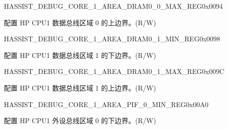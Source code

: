 \begin{register}{H}{ASSIST\_DEBUG\_CORE\_1\_AREA\_DRAM0\_0\_MAX\_REG}{0x0094}\label{regdesc:ASSISTDEBUGCORE1AREADRAM00MAXREG}
%
\regnewline%
\begin{regdesc}\begin{reglist}
\label{fielddesc:ASSISTDEBUGCORE1AREADRAM00MAX}\item [ASSIST\_DEBUG\_CORE\_1\_AREA\_DRAM0\_0\_MAX] 配置 HP CPU1 数据总线区域 0 的上边界。(R/W)
\end{reglist}\end{regdesc}
\end{register}


\begin{register}{H}{ASSIST\_DEBUG\_CORE\_1\_AREA\_DRAM0\_1\_MIN\_REG}{0x0098}\label{regdesc:ASSISTDEBUGCORE1AREADRAM01MINREG}
%
\regnewline%
\begin{regdesc}\begin{reglist}
\label{fielddesc:ASSISTDEBUGCORE1AREADRAM01MIN}\item [ASSIST\_DEBUG\_CORE\_1\_AREA\_DRAM0\_1\_MIN] 配置 HP CPU1 数据总线区域 1 的下边界。(R/W)
\end{reglist}\end{regdesc}
\end{register}


\begin{register}{H}{ASSIST\_DEBUG\_CORE\_1\_AREA\_DRAM0\_1\_MAX\_REG}{0x009C}\label{regdesc:ASSISTDEBUGCORE1AREADRAM01MAXREG}
%
\regnewline%
\begin{regdesc}\begin{reglist}
\label{fielddesc:ASSISTDEBUGCORE1AREADRAM01MAX}\item [ASSIST\_DEBUG\_CORE\_1\_AREA\_DRAM0\_1\_MAX] 配置 HP CPU1 数据总线区域 1 的上边界。(R/W)
\end{reglist}\end{regdesc}
\end{register}


\begin{register}{H}{ASSIST\_DEBUG\_CORE\_1\_AREA\_PIF\_0\_MIN\_REG}{0x00A0}\label{regdesc:ASSISTDEBUGCORE1AREAPIF0MINREG}
%
\regnewline%
\begin{regdesc}\begin{reglist}
\label{fielddesc:ASSISTDEBUGCORE1AREAPIF0MIN}\item [ASSIST\_DEBUG\_CORE\_1\_AREA\_PIF\_0\_MIN] 配置 HP CPU1 外设总线区域 0 的下边界。(R/W)
\end{reglist}\end{regdesc}
\end{register}


